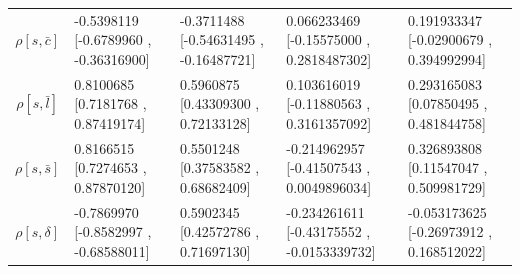 \begin{center}
\begin{tabular}{|c|p{3.7cm}|p{3.7cm}|p{3.7cm}|p{3.7cm}|}
$\rho[s,\bar{c}]$&-0.5398119 [-0.6789960 , -0.36316900]&-0.3711488 [-0.54631495 , -0.16487721]&0.066233469 [-0.15575000 , 0.2818487302]&0.191933347 [-0.02900679 , 0.394992994]\\
$\rho[s,\bar{l}]$&0.8100685 [0.7181768 , 0.87419174]&0.5960875 [0.43309300 , 0.72133128]&0.103616019 [-0.11880563 , 0.3161357092]&0.293165083 [0.07850495 , 0.481844758]\\
$\rho[s,\bar{s}]$&0.8166515 [0.7274653 , 0.87870120]&0.5501248 [0.37583582 , 0.68682409]&-0.214962957 [-0.41507543 , 0.0049896034]&0.326893808 [0.11547047 , 0.509981729]\\
$\rho[s,\delta]$&-0.7869970 [-0.8582997 , -0.68588011]&0.5902345 [0.42572786 , 0.71697130]&-0.234261611 [-0.43175552 , -0.0153339732]&-0.053173625 [-0.26973912 , 0.168512022]\\\hline
\end{tabular}


\end{center}










